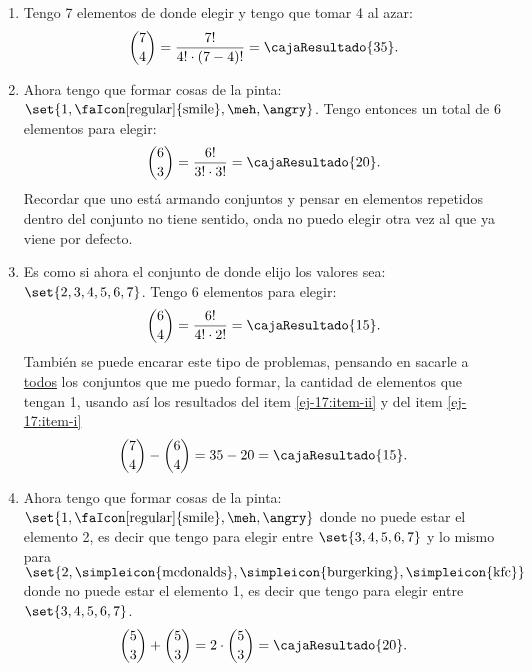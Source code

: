 \begin{enumerate}[label=\roman*)]
  \item\label{ej-17:item-i}  Tengo 7 elementos de donde elegir y tengo que tomar 4 al azar:
        $$\binom{7}{4} =
          \frac{7!}{4! \cdot (7-4)!} =
          \cajaResultado{
            35
          }
          .
        $$

  \item\label{ej-17:item-ii}
        Ahora tengo que formar cosas de la pinta: $\set{1,\text{\faIcon[regular]{smile}}, \text{\meh}, \text{\angry}}$.
        Tengo entonces un total de 6 elementos para elegir:
        $$
          \binom{6}{3} = \frac{6!}{3!\cdot 3!} =
          \cajaResultado{
            20
          }
          .
        $$
        Recordar que uno está armando conjuntos y pensar en elementos repetidos dentro del conjunto no tiene sentido, onda no puedo elegir otra vez al que
        ya viene por defecto.

  \item Es como si ahora el conjunto de donde elijo los valores sea: $\set{2,3,4,5,6,7}$. Tengo 6 elementos para elegir:
        $$
          \binom{6}{4} = \frac{6!}{4!\cdot 2!} =
          \cajaResultado{
            15
          }.
        $$
        También se puede encarar este tipo de problemas, pensando en sacarle a \underline{todos} los conjuntos que me puedo formar,
        la cantidad de elementos que tengan 1, usando así los resultados del item \ref{ej-17:item-ii} y del item \ref{ej-17:item-i}
        $$
          \binom{7}{4} - \binom{6}{4} = 35 - 20 =
          \cajaResultado{
            15
          }.
        $$

  \item
        Ahora tengo que formar cosas de la pinta: $\set{1,\text{\faIcon[regular]{smile}}, \text{\meh}, \text{\angry}}$ donde no puede
        estar el elemento 2, es decir que tengo para elegir entre $\set{3,4,5,6,7}$ y lo mismo para
        $\set{2,\text{\simpleicon{mcdonalds}}, \text{\simpleicon{burgerking}}, \text{\simpleicon{kfc}}}$ donde no puede
        estar el elemento 1, es decir que tengo para elegir entre $\set{3,4,5,6,7}$.
        $$
          \binom{5}{3} +
          \binom{5}{3} =
          2 \cdot \binom{5}{3} =
          \cajaResultado{
            20
          }.
        $$
\end{enumerate}

\begin{aportes}
  \item {}
\end{aportes}
